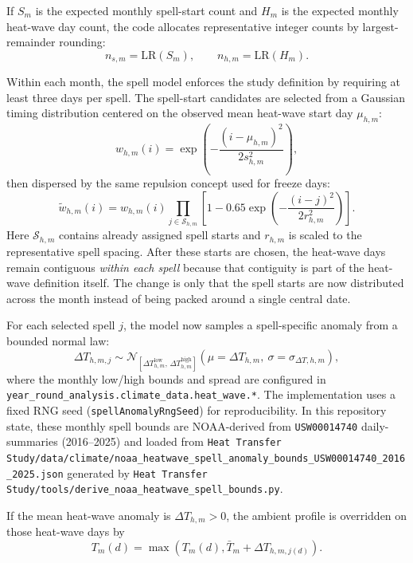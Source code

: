 \documentclass{article}
\begin{document}
If $S_m$ is the expected monthly spell-start count and $H_m$ is the expected
monthly heat-wave day count, the code allocates representative integer counts
by largest-remainder rounding:
\begin{equation}
n_{s,m} = \mathrm{LR}(S_m),
\qquad
n_{h,m} = \mathrm{LR}(H_m).
\end{equation}

Within each month, the spell model enforces the study definition by requiring
at least three days per spell. The spell-start candidates are selected from a
Gaussian timing distribution centered on the observed mean heat-wave start day
$\mu_{h,m}$:
\begin{equation}
w_{h,m}(i)
=
\exp\!\left(
-\frac{(i-\mu_{h,m})^2}{2s_{h,m}^2}
\right),
\end{equation}
then dispersed by the same repulsion concept used for freeze days:
\begin{equation}
\tilde{w}_{h,m}(i)
=
w_{h,m}(i)
\prod_{j\in\mathcal{S}_{h,m}}
\left[
1-0.65\exp\!\left(
-\frac{(i-j)^2}{2r_{h,m}^2}
\right)
\right].
\end{equation}
Here $\mathcal{S}_{h,m}$ contains already assigned spell starts and
$r_{h,m}$ is scaled to the representative spell spacing. After these starts are
chosen, the heat-wave days remain contiguous \emph{within each spell} because
that contiguity is part of the heat-wave definition itself. The change is only
that the spell starts are now distributed across the month instead of being
packed around a single central date.

For each selected spell $j$, the model now samples a spell-specific anomaly
from a bounded normal law:
\begin{equation}
\Delta T_{h,m,j}
\sim
\mathcal{N}_{[\Delta T_{h,m}^{\mathrm{low}},\,\Delta T_{h,m}^{\mathrm{high}}]}
\!\left(\mu=\Delta T_{h,m},\ \sigma=\sigma_{\Delta T,h,m}\right),
\end{equation}
where the monthly low/high bounds and spread are configured in
\texttt{year\_round\_analysis.climate\_data.heat\_wave.*}. The implementation
uses a fixed RNG seed (\texttt{spellAnomalyRngSeed}) for reproducibility. In
this repository state, these monthly spell bounds are NOAA-derived from
\texttt{USW00014740} daily-summaries (2016--2025) and loaded from
\texttt{Heat Transfer Study/data/climate/noaa\_heatwave\_spell\_anomaly\_bounds\_USW00014740\_2016\_2025.json}
generated by
\texttt{Heat Transfer Study/tools/derive\_noaa\_heatwave\_spell\_bounds.py}.

If the mean heat-wave anomaly is $\Delta T_{h,m}>0$, the ambient profile is
overridden on those heat-wave days by
\begin{equation}
T_m(d)
=
\max\!\left(
T_m(d),
\bar{T}_m + \Delta T_{h,m,j(d)}
\right).
\end{equation}
\end{document}

